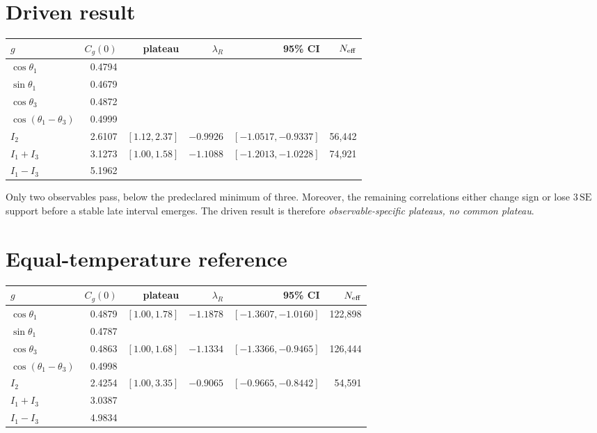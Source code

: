 \documentclass[11pt]{article}
\newcommand{\NA}{\textemdash}
\begin{document}
\section*{Driven result}
\begin{table}[h]
\centering\small
\begin{tabular}{lrrrrr}
\toprule
$g$ & $C_g(0)$ & plateau & $\lambda_R$ & 95\% CI & $N_{\rm eff}$\\
\midrule
$\cos\theta_1$ & 0.4794 & \NA & \NA & \NA & \NA\\
$\sin\theta_1$ & 0.4679 & \NA & \NA & \NA & \NA\\
$\cos\theta_3$ & 0.4872 & \NA & \NA & \NA & \NA\\
$\cos(\theta_1-\theta_3)$ & 0.4999 & \NA & \NA & \NA & \NA\\
$I_2$ & 2.6107 & $[1.12,2.37]$ & $-0.9926$ & $[-1.0517,-0.9337]$ & 56,442\\
$I_1+I_3$ & 3.1273 & $[1.00,1.58]$ & $-1.1088$ & $[-1.2013,-1.0228]$ & 74,921\\
$I_1-I_3$ & 5.1962 & \NA & \NA & \NA & \NA\\
\bottomrule
\end{tabular}
\end{table}

Only two observables pass, below the predeclared minimum of three.  Moreover,
the remaining correlations either change sign or lose $3\,\mathrm{SE}$ support
before a stable late interval emerges.  The driven result is therefore
\emph{observable-specific plateaus, no common plateau}.

\section*{Equal-temperature reference}
\begin{table}[h]
\centering\small
\begin{tabular}{lrrrrr}
\toprule
$g$ & $C_g(0)$ & plateau & $\lambda_R$ & 95\% CI & $N_{\rm eff}$\\
\midrule
$\cos\theta_1$ & 0.4879 & $[1.00,1.78]$ & $-1.1878$ & $[-1.3607,-1.0160]$ & 122,898\\
$\sin\theta_1$ & 0.4787 & \NA & \NA & \NA & \NA\\
$\cos\theta_3$ & 0.4863 & $[1.00,1.68]$ & $-1.1334$ & $[-1.3366,-0.9465]$ & 126,444\\
$\cos(\theta_1-\theta_3)$ & 0.4998 & \NA & \NA & \NA & \NA\\
$I_2$ & 2.4254 & $[1.00,3.35]$ & $-0.9065$ & $[-0.9665,-0.8442]$ & 54,591\\
$I_1+I_3$ & 3.0387 & \NA & \NA & \NA & \NA\\
$I_1-I_3$ & 4.9834 & \NA & \NA & \NA & \NA\\
\bottomrule
\end{tabular}
\end{table}
\end{document}
